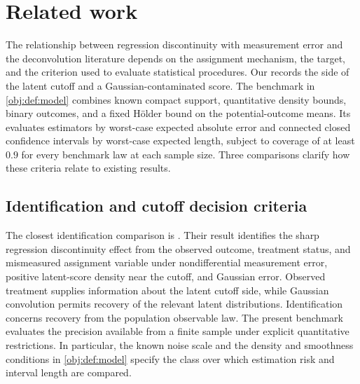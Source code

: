 \section{Related work}\label{sec:related-work}

The relationship between regression discontinuity with measurement error and the deconvolution literature depends on the assignment mechanism, the target, and the criterion used to evaluate statistical procedures. Our  records the side of the latent cutoff and a Gaussian-contaminated score. The benchmark in \cref{obj:def:model} combines known compact support, quantitative density bounds, binary outcomes, and a fixed Hölder bound on the potential-outcome means. Its  evaluates estimators by worst-case expected absolute error and connected closed confidence intervals by worst-case expected length, subject to coverage of at least \(0.9\) for every benchmark law at each sample size. Three comparisons clarify how these criteria relate to existing results.

\subsection{Identification and cutoff decision criteria}

The closest identification comparison is \citet[Assumptions 1Y, 2C, and 7; Proposition 4(b)]{PeiShen2017DevilTails}. Their result identifies the sharp regression discontinuity effect from the observed outcome, treatment status, and mismeasured assignment variable under nondifferential measurement error, positive latent-score density near the cutoff, and Gaussian error. Observed treatment supplies information about the latent cutoff side, while Gaussian convolution permits recovery of the relevant latent distributions. Identification concerns recovery from the population observable law. The present benchmark evaluates the precision available from a finite sample under explicit quantitative restrictions. In particular, the known noise scale and the density and smoothness conditions in \cref{obj:def:model} specify the class over which estimation risk and interval length are compared.

